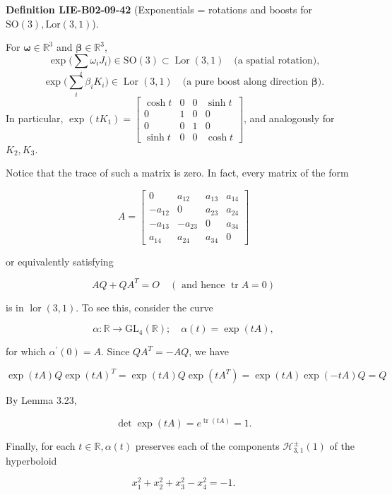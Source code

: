 \documentclass[10pt, letterpaper]{article}
\newcommand{\SO}{\mathrm{SO}}
\newcommand{\CustomHeading}[3]{%
  \par\medskip\noindent%
  \textbf{#1 #2} \textnormal{(#3)}.\enskip%
}
\newenvironment{DEF}[2]{\begin{unitbox}\CustomHeading{Definition}{#1}{#2}}{\end{unitbox}}
\begin{document}
\begin{DEF}{LIE-B02-09-42}{Exponentials = rotations and boosts for $\SO(3), \mathrm{Lor}(3,1)$}
For \(\boldsymbol{\omega}\in\mathbb{R}^3\) and \(\boldsymbol{\beta}\in\mathbb{R}^3\),
\[
\exp\!\Big(\sum_i \omega_i J_i\Big)\in \mathrm{SO}(3)\subset \operatorname{Lor}(3,1)
\quad\text{(a spatial rotation),}
\]
\[
\exp\!\Big(\sum_i \beta_i K_i\Big)\in \operatorname{Lor}(3,1)
\quad\text{(a pure boost along direction \(\boldsymbol{\beta}\)).}
\]
In particular, \(\exp(tK_1)=
\begin{bmatrix}
\cosh t&0&0&\sinh t\\
0&1&0&0\\
0&0&1&0\\
\sinh t&0&0&\cosh t
\end{bmatrix}\),
and analogously for \(K_2,K_3\).
\end{DEF}




Notice that the trace of such a matrix is zero. In fact, every matrix of the form

$$
A=\left[\begin{array}{cccc}
0 & a_{12} & a_{13} & a_{14} \\
-a_{12} & 0 & a_{23} & a_{24} \\
-a_{13} & -a_{23} & 0 & a_{34} \\
a_{14} & a_{24} & a_{34} & 0
\end{array}\right]
$$

or equivalently satisfying

$$
A Q+Q A^{T}=O \quad(\text { and hence } \operatorname{tr} A=0)
$$

is in $\operatorname{lor}(3,1)$. To see this, consider the curve

$$
\alpha: \mathbb{R} \longrightarrow \mathrm{GL}_{4}(\mathbb{R}) ; \quad \alpha(t)=\exp (t A),
$$

for which $\alpha^{\prime}(0)=A$. Since $Q A^{T}=-A Q$, we have

$$
\exp (t A) Q \exp (t A)^{T}=\exp (t A) Q \exp \left(t A^{T}\right)=\exp (t A) \exp (-t A) Q=Q
$$

By Lemma 3.23,

$$
\operatorname{det} \exp (t A)=e^{\operatorname{tr}(t A)}=1 .
$$

Finally, for each $t \in \mathbb{R}, \alpha(t)$ preserves each of the components $\mathcal{H}_{3,1}^{ \pm}(1)$ of the hyperboloid

$$
x_{1}^{2}+x_{2}^{2}+x_{3}^{2}-x_{4}^{2}=-1 .
$$
\end{document}
